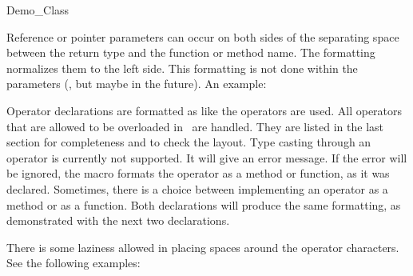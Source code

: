 \begin{class}{Demo_Class}
{  

Reference or pointer parameters can occur on both sides of the
separating space between the return type and the function or method
name. The formatting normalizes them to the left side. This
formatting is not done within the parameters (, but maybe in the
future). An example: 





Operator declarations are formatted as like the operators are
used.  All operators that are allowed to be overloaded in \CC\ are
handled. They are listed in the last section for completeness and
to check the layout. Type casting through an operator is currently
not supported. It will give an error message. If the error will be
ignored, the macro formats the operator as a method or function,
as it was declared. Sometimes, there is a choice between
implementing an operator as a method or as a function. Both
declarations will produce the same formatting, as demonstrated
with the next two declarations.



There is some laziness allowed in placing spaces around the operator
characters. See the following examples:





}
\end{class}
